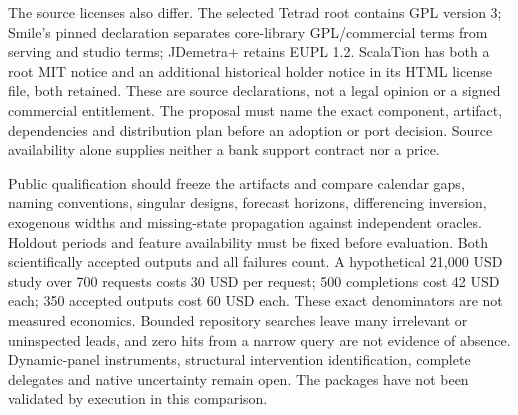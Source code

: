 The source licenses also differ. The selected Tetrad root contains GPL version 3; Smile's pinned declaration separates core-library GPL/commercial terms from serving and studio terms; JDemetra+ retains EUPL 1.2. ScalaTion has both a root MIT notice and an additional historical holder notice in its HTML license file, both retained. These are source declarations, not a legal opinion or a signed commercial entitlement. The proposal must name the exact component, artifact, dependencies and distribution plan before an adoption or port decision. Source availability alone supplies neither a bank support contract nor a price.\citep{exec25_jdyn_tetrad,exec25_jdyn_smile,exec25_jdyn_scalation,exec25_jdyn_jdplus}

Public qualification should freeze the artifacts and compare calendar gaps, naming conventions, singular designs, forecast horizons, differencing inversion, exogenous widths and missing-state propagation against independent oracles. Holdout periods and feature availability must be fixed before evaluation. Both scientifically accepted outputs and all failures count. A hypothetical 21,000 USD study over 700 requests costs 30 USD per request; 500 completions cost 42 USD each; 350 accepted outputs cost 60 USD each. These exact denominators are not measured economics. Bounded repository searches leave many irrelevant or uninspected leads, and zero hits from a narrow query are not evidence of absence. Dynamic-panel instruments, structural intervention identification, complete delegates and native uncertainty remain open. The packages have not been validated by execution in this comparison.\citep{exec25_jdyn_choice}
